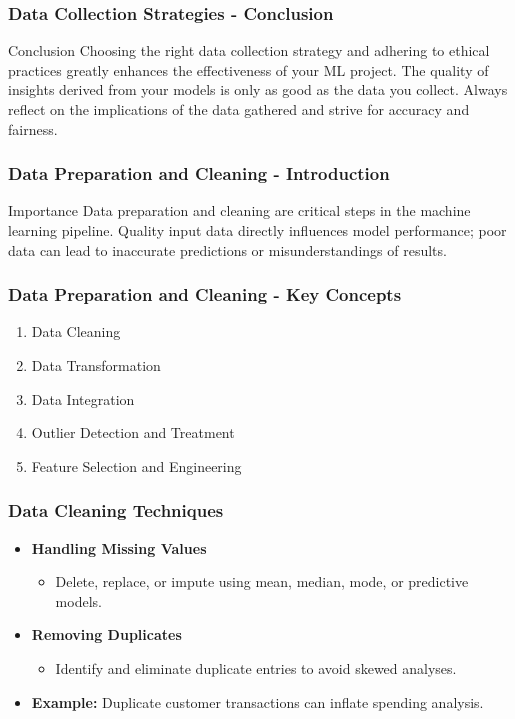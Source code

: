 \documentclass[aspectratio=169]{beamer}
\begin{document}
\begin{frame}[fragile]
    \frametitle{Data Collection Strategies - Conclusion}
    \begin{block}{Conclusion}
        Choosing the right data collection strategy and adhering to ethical practices greatly enhances the effectiveness of your ML project. The quality of insights derived from your models is only as good as the data you collect. Always reflect on the implications of the data gathered and strive for accuracy and fairness.
    \end{block}
\end{frame}

\begin{frame}[fragile]
    \frametitle{Data Preparation and Cleaning - Introduction}
    \begin{block}{Importance}
        Data preparation and cleaning are critical steps in the machine learning pipeline. Quality input data directly influences model performance; poor data can lead to inaccurate predictions or misunderstandings of results.
    \end{block}
\end{frame}

\begin{frame}[fragile]
    \frametitle{Data Preparation and Cleaning - Key Concepts}
    \begin{enumerate}
        \item Data Cleaning
        \item Data Transformation
        \item Data Integration
        \item Outlier Detection and Treatment
        \item Feature Selection and Engineering
    \end{enumerate}
\end{frame}

\begin{frame}[fragile]
    \frametitle{Data Cleaning Techniques}
    \begin{itemize}
        \item \textbf{Handling Missing Values}
            \begin{itemize}
                \item Delete, replace, or impute using mean, median, mode, or predictive models.
            \end{itemize}
        \item \textbf{Removing Duplicates}
            \begin{itemize}
                \item Identify and eliminate duplicate entries to avoid skewed analyses.
            \end{itemize}
        \item \textbf{Example:} Duplicate customer transactions can inflate spending analysis.
    \end{itemize}
\end{frame}
\end{document}
